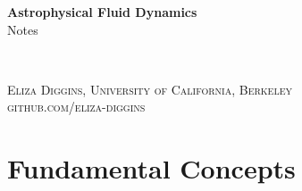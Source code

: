 \documentclass[11pt,fleqn]{book} %
\begin{document}

\begingroup
\thispagestyle{empty}
\centering
\vspace*{5cm}
\par\normalfont\fontsize{35}{35}\sffamily\selectfont
\textbf{Astrophysical Fluid Dynamics}\\

\vspace*{1cm}
{\Huge Notes}\par %
\endgroup


\newpage
~\vfill
\thispagestyle{empty}


\noindent \textsc{Eliza Diggins, University of California, Berkeley}\\

\noindent \textsc{github.com/eliza-diggins}\\ %




\pagestyle{empty} %

\tableofcontents %


\pagestyle{fancy} %

\chapter{Fundamental Concepts}

\end{document}
